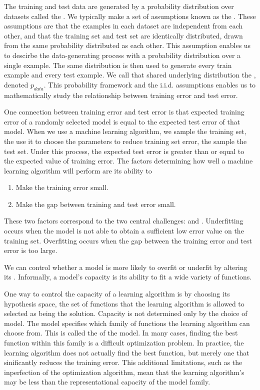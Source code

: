 The training and test data are generated by a probability distribution over datasets called the .
We typically make a set of assumptions known as the .
These assumptions are that the examples in each dataset are independent from each other, and that the training set and test set are identically distributed, drawn from the same probability distributed as each other.
This assumption enables us to descirbe the data-generating process with a probability distribution over a single example.
The same distribution is then used to generate every train example and every test example.
We call that shared underlying distribution the , denoted $p_{data}$.
This probability framework and the i.i.d. assumptions enables us to mathematically study the relationship between training error and test error.


One connection between training error and test error is that expected training error of a randomly selected model is equal to the expected test error of that model.
When we use a machine learning algorithm, we sample the training set, the use it to choose the parameters to reduce training set error, the sample the test set.
Under this process, the expected test error is greater than or equal to the expected value of training error.
The factors determining how well a machine learning algorithm will perform are its ability to
\begin{enumerate}
\item Make the training error small.
\item Make the gap between training and test error small.
\end{enumerate}
These two factors correspond to the two central challenges:  and .
Underfitting occurs when the model is not able to obtain a sufficient low error value on the training set.
Overfitting occurs when the gap between the training error and test error is too large.

We can control whether a model is more likely to overfit or underfit by altering its .
Informally, a model's capacity is its ability to fit a wide variety of functions.


One way to control the capacity of a learning algorithm is by choosing its hypothesis space, the set of functions that the learning algorithm is allowed to selected as being the solution.
Capacity is not determined only by the choice of model.
The model specifies which family of functions the learning algorithm can choose from.
This is called the  of the model.
In many cases, finding the best function within this family is a difficult optimization problem.
In practice, the learning algorithm does not actually find the best function, but merely one that sinificantly reduces the training error.
This additional limitations, such as the inperfection of the optimization algorithm, mean that the learning algorithm's  may be less than the representational capacity of the model family.

